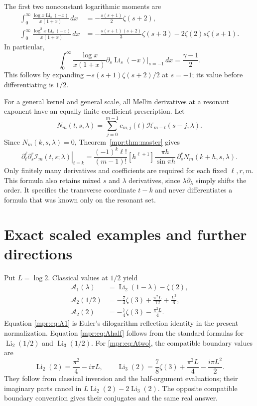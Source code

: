 \documentclass[11pt,letterpaper]{article}
\numberwithin{equation}{section}
\theoremstyle{definition}
\theoremstyle{remark}
\begin{document}
The first two nonconstant logarithmic moments are
\begin{align*}
 \int_0^\infty\frac{\log x\operatorname{Li}_s(-x)}{x(1+x)}\,dx
   &=-\frac{s(s+1)}2\zeta(s+2),\\
 \int_0^\infty\frac{\log^2x\operatorname{Li}_s(-x)}{x(1+x)}\,dx
   &=-\frac{s(s+1)(s+2)}3\zeta(s+3)
                           -2\zeta(2)s\zeta(s+1).
\end{align*}
In particular,
\[
 \int_0^\infty\frac{\log x}{x(1+x)}
      \left.\partial_s\operatorname{Li}_s(-x)\right|_{s=-1}\,dx
       =\frac{\gamma-1}{2}.
\]
This follows by expanding
$-s(s+1)\zeta(s+2)/2$ at $s=-1$; its value before differentiating is
$1/2$.

For a general kernel and general scale, all Mellin derivatives at a
resonant exponent have an equally finite coefficient prescription.
Let
\[
 N_m(t,s,\lambda)
     =\sum_{j=0}^{m-1}c_{m,j}(t)\mathcal H_{m-t}(s-j,\lambda).
\]
Since $N_m(k,s,\lambda)=0$, Theorem~\ref{mpr:thm:master} gives
\begin{equation}\label{mpr:eq:mixedcompiler}
 \left.\partial_t^\ell\partial_s^r
                      \mathcal I_m(t,s;\lambda)\right|_{t=k}
 =\frac{(-1)^k\ell!}{(m-1)!}
   [h^{\ell+1}]\frac{\pi h}{\sin\pi h}\,
                       \partial_s^r N_m(k+h,s,\lambda).
\end{equation}
Only finitely many derivatives and coefficients are required for each
fixed $\ell,r,m$.  This formula also retains mixed $s$ and $\lambda$
derivatives, since $\lambda\partial_\lambda$ simply shifts the order.
It specifies the transverse coordinate $t-k$ and never differentiates a
formula that was known only on the resonant set.

\section{Exact scaled examples and further directions}
\label{mpr:sec:examples}

Put $L=\log2$.  Classical values at $1/2$ yield
\begin{align}
 \mathcal A_1(\lambda)
       &=\operatorname{Li}_2(1-\lambda)-\zeta(2),
            \label{mpr:eq:A1}\\
 \mathcal A_2(1/2)
       &=-\frac74\zeta(3)+\frac{\pi^2L}{12}+
                                               \frac{L^3}{6},
            \label{mpr:eq:Ahalf}\\
 \mathcal A_2(2)
       &=-\frac74\zeta(3)-\frac{\pi^2L}{4}.
            \label{mpr:eq:Atwo}
\end{align}
Equation \eqref{mpr:eq:A1} is Euler's dilogarithm reflection identity in
the present normalization.  Equation \eqref{mpr:eq:Ahalf} follows from
the standard formulas for $\operatorname{Li}_2(1/2)$ and
$\operatorname{Li}_3(1/2)$.
For \eqref{mpr:eq:Atwo}, the compatible boundary values are
\[
 \operatorname{Li}_2(2)=\frac{\pi^2}{4}-i\pi L,\qquad
 \operatorname{Li}_3(2)=\frac78\zeta(3)+\frac{\pi^2L}{4}
                                           -\frac{i\pi L^2}{2}.
\]
They follow from classical inversion and the half-argument evaluations;
their imaginary parts cancel in $L\operatorname{Li}_2(2)
-2\operatorname{Li}_3(2)$.  The opposite compatible boundary convention
gives their conjugates and the same real answer.
\end{document}
